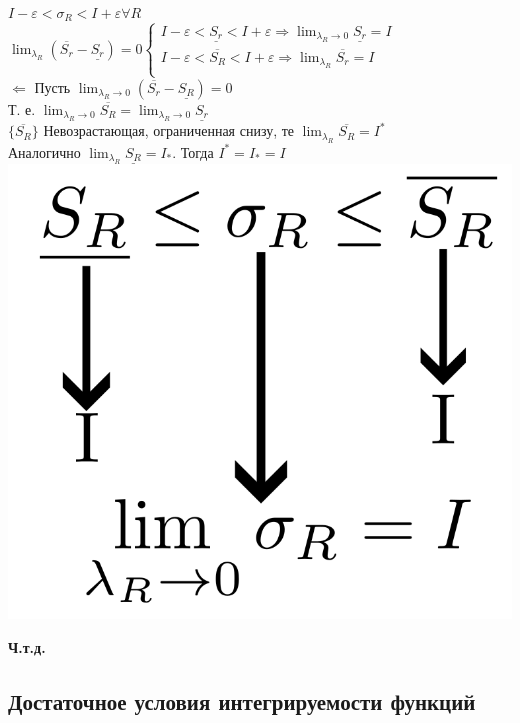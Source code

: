 \documentclass[12pt]{article}
\let\ORIincludegraphics\includegraphics
\renewcommand{\includegraphics}[2][]{\ORIincludegraphics[scale=0.65,#1]{#2}}
\begin{document}
\begin{enumerate}
\begin{adjustwidth}{1.5em}{1.5em}
            $I-\varepsilon < \sigma_R < I+\varepsilon \forall R$\\
            $\lim_{\lambda_R}(\overline{S_r}-\underline{S_r})=0\begin{cases}
                I-\varepsilon < \underline{S_r}<I+\varepsilon \Rightarrow \lim_{\lambda_R \to 0} \underline{S_r}=I\\
                I-\varepsilon < \overline{S_R} < I + \varepsilon \Rightarrow \lim_{\lambda_R} \overline{S_r} = I\\
            \end{cases}$\\
            $\Leftarrow$ Пусть $\lim_{\lambda_R \to 0}(\overline{S_r}-\underline{S_R})=0$\\
            Т. е. $\lim_{\lambda_R \to 0} \overline{S_R} = \lim_{\lambda_R \to 0} \underline{S_r}$\\
            $\{\overline{S_R}\}$ Невозрастающая, ограниченная снизу, те $\lim_{\lambda_R} \overline{S_R} = I^*$\\
            Аналогично $\lim_{\lambda_R} \underline{S_R} = I_*$. Тогда $I^* = I_* = I$\\
            \includegraphics[width=0.8\linewidth]{6.4.2.png}
            \begin{center}
                \textbf{Ч.т.д.}
            \end{center}
        \end{adjustwidth}
    \end{enumerate}
    \subsection{Достаточное условия интегрируемости функций}
\end{document}
